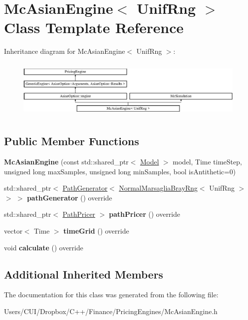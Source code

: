 \hypertarget{class_mc_asian_engine}{}\section{Mc\+Asian\+Engine$<$ Unif\+Rng $>$ Class Template Reference}
\label{class_mc_asian_engine}
Inheritance diagram for Mc\+Asian\+Engine$<$ Unif\+Rng $>$\+:\begin{figure}[H]
\begin{center}
\leavevmode
\includegraphics[height=2.894057cm]{class_mc_asian_engine}
\end{center}
\end{figure}
\subsection*{Public Member Functions}
\begin{DoxyCompactItemize}
\item 
\hypertarget{class_mc_asian_engine_a8688d15638d6176095dab92ef31ad3ad}{}\label{class_mc_asian_engine_a8688d15638d6176095dab92ef31ad3ad} 
{\bfseries Mc\+Asian\+Engine} (const std\+::shared\+\_\+ptr$<$ \hyperlink{class_model}{Model} $>$ model, Time time\+Step, unsigned long max\+Samples, unsigned long min\+Samples, bool is\+Antithetic=0)
\item 
\hypertarget{class_mc_asian_engine_a93c9216b38bcbe0fe7e8131bf975dbc2}{}\label{class_mc_asian_engine_a93c9216b38bcbe0fe7e8131bf975dbc2} 
std\+::shared\+\_\+ptr$<$ \hyperlink{class_path_generator}{Path\+Generator}$<$ \hyperlink{class_normal_marsaglia_bray_rng}{Normal\+Marsaglia\+Bray\+Rng}$<$ Unif\+Rng $>$ $>$ $>$ {\bfseries path\+Generator} () override
\item 
\hypertarget{class_mc_asian_engine_afb903df1f8e0023a1f6bfae43ccbc8f7}{}\label{class_mc_asian_engine_afb903df1f8e0023a1f6bfae43ccbc8f7} 
std\+::shared\+\_\+ptr$<$ \hyperlink{class_path_pricer}{Path\+Pricer} $>$ {\bfseries path\+Pricer} () override
\item 
\hypertarget{class_mc_asian_engine_a4c16366e8dec7d689e934cbafe413332}{}\label{class_mc_asian_engine_a4c16366e8dec7d689e934cbafe413332} 
vector$<$ Time $>$ {\bfseries time\+Grid} () override
\item 
\hypertarget{class_mc_asian_engine_a4e67149307de395f821c8aa07afad3b8}{}\label{class_mc_asian_engine_a4e67149307de395f821c8aa07afad3b8} 
void {\bfseries calculate} () override
\end{DoxyCompactItemize}
\subsection*{Additional Inherited Members}


The documentation for this class was generated from the following file\+:\begin{DoxyCompactItemize}
\item 
Users/\+C\+U\+I/\+Dropbox/\+C++/\+Finance/\+Pricing\+Engines/Mc\+Asian\+Engine.\+h\end{DoxyCompactItemize}
